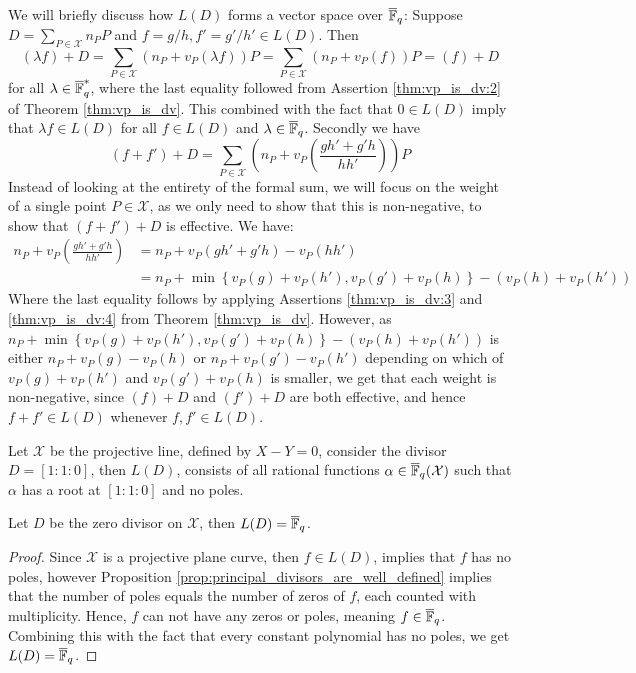 \newpage
We will briefly discuss how $L(D)$ forms a vector space over $\overline{\mathbb{F}}_{q}$: Suppose $D = \sum_{P \in \mathcal{X}} n_{P} P$ and $f = g/h, f' = g'/h' \in L(D)$. Then
\begin{equation*}
(\lambda f) + D = \sum_{P \in \mathcal{X}} (n_{P} + v_{P}(\lambda f))P = \sum_{P \in \mathcal{X}} \left(n_{P} + v_{P}(f)\right)P = (f) + D
\end{equation*}
for all $\lambda \in \overline{\mathbb{F}}_{q}^{*}$, where the last equality followed from Assertion \ref{thm:vp_is_dv:2} of Theorem \ref{thm:vp_is_dv}. This combined with the fact that $0 \in L(D)$ imply that $\lambda f \in L(D)$ for all $f \in L(D)$ and $\lambda \in \overline{\mathbb{F}}_{q}$. Secondly we have
\begin{equation*}
  (f + f') + D = \sum_{P \in \mathcal{X}} \left(n_{P} + v_{P}\left(\frac{gh' + g'h}{h h'}\right)\right) P
\end{equation*}
Instead of looking at the entirety of the formal sum, we will focus on the weight of a single point $P \in \mathcal{X}$, as we only need to show that this is non-negative, to show that $(f + f') + D$ is effective. We have:
\begin{align*}
  n_{P} + v_{P}\left(\frac{gh' + g'h}{h h'}\right) &= n_{P} + v_{P}(gh' + g'h) - v_{P}(h h') \\
                                                   &= n_{P} + \min \left\{v_{P}(g) + v_{P}(h'), v_P(g') + v_P(h)\right\} - (v_P(h) + v_{P}(h'))
\end{align*}
Where the last equality follows by applying Assertions \ref{thm:vp_is_dv:3} and \ref{thm:vp_is_dv:4} from Theorem \ref{thm:vp_is_dv}. However, as $n_{P} + \min \left\{v_{P}(g) + v_{P}(h'), v_P(g') + v_P(h)\right\} - (v_P(h) + v_{P}(h'))$ is either $n_{P} + v_{P}(g) - v_{P}(h)$ or $n_{P} + v_P(g') - v_{P}(h')$ depending on which of $v_{P}(g) + v_{P}(h')$ and $v_P(g') + v_P(h)$ is smaller, we get that each weight is non-negative, since $(f) + D$ and $(f') + D$ are both effective, and hence $f + f' \in L(D)$ whenever $f, f' \in L(D)$.

\begin{example}
  Let $\mathcal{X}$ be the projective line, defined by $X - Y = 0$, consider the divisor $D = [1 : 1 : 0]$, then $L(D)$, consists of all rational functions $\alpha \in \overline{\mathbb{F}}_{q}(\mathcal{X})$ such that $\alpha$ has a root at $[1 : 1 : 0]$ and no poles.
\end{example}

\begin{lemma}\label{lem:L_of_zero}
  Let $D$ be the zero divisor on $\mathcal{X}$, then $L(D) = \overline{\mathbb{F}}_{q}$.
\end{lemma}
\begin{proof}
  Since $\mathcal{X}$ is a projective plane curve, then $f \in L(D)$, implies that $f$ has no poles, however Proposition \ref{prop:principal_divisors_are_well_defined} implies that the number of poles equals the number of zeros of $f$, each counted with multiplicity. Hence, $f$ can not have any zeros or poles, meaning $f \in \overline{\mathbb{F}}_{q}$. Combining this with the fact that every constant polynomial has no poles, we get $L(D) = \overline{\mathbb{F}}_{q}$.
\end{proof}

